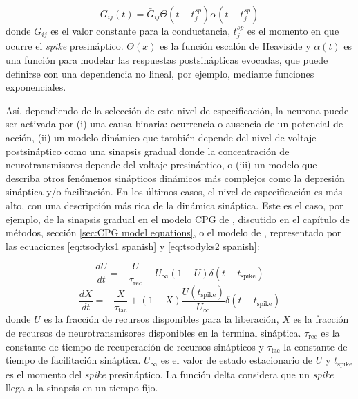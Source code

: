 \begin{equation}
	G_{ij}(t) = \bar{G}_{ij}  \Theta(t-t_j^{sp}) \alpha (t-t_j^{sp})
	\label{eq: Gii spanish}
\end{equation}
\noindent donde $\bar{G}_{ij}$ es el valor constante para la conductancia, $t_j^{sp}$ es el momento en que ocurre el \textit{spike} presináptico. $\Theta(x)$ es la función escalón de Heaviside y $\alpha(t)$ es una función para modelar las respuestas postsinápticas evocadas, que puede definirse con una dependencia no lineal, por ejemplo, mediante funciones exponenciales.

Así, dependiendo de la selección de este nivel de especificación, la neurona puede ser activada por (i) una causa binaria: ocurrencia o ausencia de un potencial de acción, (ii) un modelo dinámico que también depende del nivel de voltaje postsináptico como una sinapsis gradual donde la concentración de neurotransmisores depende del voltaje presináptico, o (iii) un modelo que describa otros fenómenos sinápticos dinámicos más complejos como la depresión sináptica y/o facilitación. En los últimos casos, el nivel de especificación es más alto, con una descripción más rica de la dinámica sináptica. Este es el caso, por ejemplo, de la sinapsis gradual en el modelo CPG de \textcite{vavoulis_dynamic_2007}, discutido en el capítulo de métodos, sección \ref{sec:CPG model equations}, o el modelo de \textcite{tsodyks_neural_1997}, representado por las ecuaciones \ref{eq:tsodyks1 spanish} y \ref{eq:tsodyks2 spanish}:

\begin{equation}
	\frac{dU}{dt} = -\frac{U}{\tau_{\text{rec}}} + U_{\infty}(1 - U) \delta(t - t_{\text{spike}})
	\label{eq:tsodyks1 spanish}
\end{equation}
\begin{equation}
	\frac{dX}{dt} = -\frac{X}{\tau_{\text{fac}}} + (1 - X) \frac{U(t_{\text{spike}})}{U_{\infty}} \delta(t - t_{\text{spike}})
	\label{eq:tsodyks2 spanish}
\end{equation}
\noindent donde $U$ es la fracción de recursos disponibles para la liberación, $X$ es la fracción de recursos de neurotransmisores disponibles en la terminal sináptica. $\tau_\text{rec}$ es la constante de tiempo de recuperación de recursos sinápticos y $\tau_\text{fac}$ la constante de tiempo de facilitación sináptica. $U_\infty$ es el valor de estado estacionario de $U$ y $t_{\text{spike}}$ es el momento del \textit{spike} presináptico. La función delta considera que un \textit{spike} llega a la sinapsis en un tiempo fijo.


